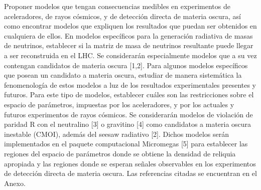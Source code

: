 Proponer modelos que tengan consecuencias medibles en experimentos de aceleradores, de rayos cósmicos, y de detección directa de materia oscura, así como encontrar modelos que expliquen los resultados que puedan ser obtenidos en cualquiera de ellos. En modelos específicos para la generación radiativa de masas de neutrinos, establecer si la matriz de masa de neutrinos resultante puede llegar a ser reconstruida en el LHC. Se considerarán especialmente modelos que a su vez contengan candidatos de materia oscura [1,2]. Para algunos modelos específicos que posean un candidato a materia oscura, estudiar de manera sistemática la fenomenología de estos modelos a luz de los resultados experimentales presentes y futuros. Para este tipo de modelos, establecer cuáles son las restricciones sobre el espacio de parámetros, impuestas por los aceleradores, y por los actuales y futuros experimentos de rayos cósmicos. Se considerarán modelos de violación de paridad R con el neutralino [3] o gravitino [4] como candidatos a materia oscura inestable (CMOI), además del seesaw radiativo [2]. Dichos modelos serán implementados en el paquete computacional Micromegas [5] para establecer las regiones del espacio de parámetros donde se obtiene la densidad de reliquia apropiada y las regiones donde se esperan señales observables en los experimentos de detección directa de materia oscura. Las referencias citadas se encuentran en el Anexo.


